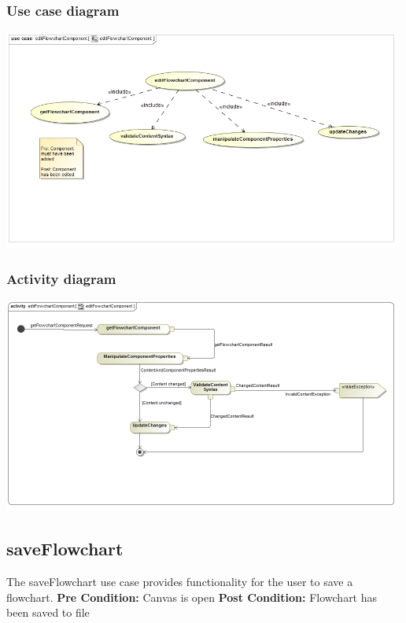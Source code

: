 \documentclass[11pt,a4paper,titlepage]{article}
\begin{document}
\subsubsection{Use case diagram}
\includegraphics[width=500px]{editFlowchartComponentUseCase.jpg}

\subsubsection{Activity diagram}
\includegraphics[width=500px]{editFowchartComponent.jpg}

\subsection{saveFlowchart}
The saveFlowchart use case provides functionality for the user to save a flowchart.\newline\newline
\textbf{Pre Condition:} Canvas is open\newline\newline
\textbf{Post Condition:} Flowchart has been saved to file
\end{document}
